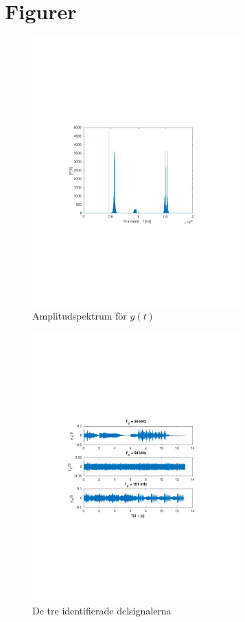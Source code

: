 \documentclass[10pt,twocolumn]{article}
\begin{document}
\clearpage

\section*{Figurer}

\begin{figure}[H]
\includegraphics[trim={3.8cm 8cm 4.8cm 9cm},clip,width=8cm]{Y.pdf}
\caption{Amplitudspektrum för $y(t)$}
\end{figure}

\begin{figure}[H]
\includegraphics[trim={3.8cm 8cm 4.8cm 9cm},clip,width=8cm]{carried_signals.pdf}
\caption{De tre identifierade delsignalerna}
\end{figure}
\end{document}
